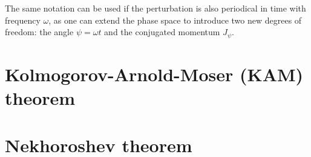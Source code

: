 The same notation can be used if the perturbation is also periodical in time with frequency $\omega$, as one can extend the phase space to introduce two new degrees of freedom: the angle $\psi=\omega t$ and the conjugated momentum $J_\psi$.


\section{Kolmogorov-Arnold-Moser (KAM) theorem}\label{sec:1:kam}

\section{Nekhoroshev theorem}\label{sec:1:nekhoroshev}

